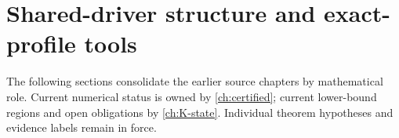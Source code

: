 \chapter{Shared-driver structure and exact-profile tools}\label{ch:08-shared-structure}
\noindent The following sections consolidate the earlier source chapters by mathematical role. Current numerical status is owned by \autoref{ch:certified}; current lower-bound regions and open obligations by \autoref{ch:K-state}. Individual theorem hypotheses and evidence labels remain in force.








